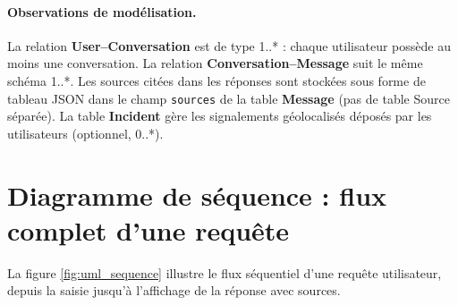 \documentclass[12pt,a4paper,oneside]{report}
\begin{document}
\paragraph{Observations de mod\'{e}lisation.}
La relation \textbf{User--Conversation} est de type 1..* : chaque utilisateur poss\`{e}de au moins une conversation. La relation \textbf{Conversation--Message} suit le m\^{e}me sch\'{e}ma 1..*. Les sources cit\'{e}es dans les r\'{e}ponses sont stock\'{e}es sous forme de tableau JSON dans le champ \texttt{sources} de la table \textbf{Message} (pas de table Source s\'{e}par\'{e}e). La table \textbf{Incident} g\`{e}re les signalements g\'{e}olocalis\'{e}s d\'{e}pos\'{e}s par les utilisateurs (optionnel, 0..*).

\section{Diagramme de s\'{e}quence : flux complet d'une requ\^{e}te}

La figure \ref{fig:uml_sequence} illustre le flux s\'{e}quentiel d'une requ\^{e}te utilisateur, depuis la saisie jusqu'\`{a} l'affichage de la r\'{e}ponse avec sources.
\end{document}
